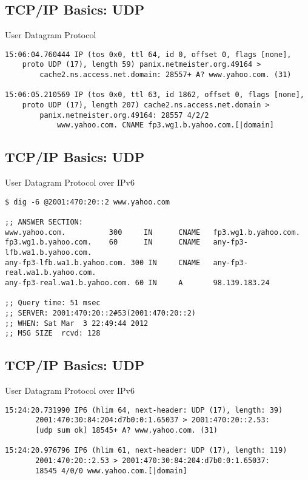 \documentclass[xga]{xdvislides}
\begin{document}
\subsection{TCP/IP Basics: UDP}
\begin{center}
User Datagram Protocol
\end{center}
\vspace{.2in}
\begin{verbatim}
15:06:04.760444 IP (tos 0x0, ttl 64, id 0, offset 0, flags [none],
    proto UDP (17), length 59) panix.netmeister.org.49164 >
        cache2.ns.access.net.domain: 28557+ A? www.yahoo.com. (31)

15:06:05.210569 IP (tos 0x0, ttl 63, id 1862, offset 0, flags [none],
    proto UDP (17), length 207) cache2.ns.access.net.domain >
        panix.netmeister.org.49164: 28557 4/2/2
            www.yahoo.com. CNAME fp3.wg1.b.yahoo.com.[|domain]
\end{verbatim}

\subsection{TCP/IP Basics: UDP}
\begin{center}
User Datagram Protocol over IPv6
\end{center}
\vspace{.2in}
\begin{verbatim}
$ dig -6 @2001:470:20::2 www.yahoo.com

;; ANSWER SECTION:
www.yahoo.com.          300     IN      CNAME   fp3.wg1.b.yahoo.com.
fp3.wg1.b.yahoo.com.    60      IN      CNAME   any-fp3-lfb.wa1.b.yahoo.com.
any-fp3-lfb.wa1.b.yahoo.com. 300 IN     CNAME   any-fp3-real.wa1.b.yahoo.com.
any-fp3-real.wa1.b.yahoo.com. 60 IN     A       98.139.183.24

;; Query time: 51 msec
;; SERVER: 2001:470:20::2#53(2001:470:20::2)
;; WHEN: Sat Mar  3 22:49:44 2012
;; MSG SIZE  rcvd: 128

\end{verbatim}

\subsection{TCP/IP Basics: UDP}
\begin{center}
User Datagram Protocol over IPv6
\end{center}
\vspace{.2in}
\begin{verbatim}
15:24:20.731990 IP6 (hlim 64, next-header: UDP (17), length: 39)
       2001:470:30:84:204:d7b0:0:1.65037 > 2001:470:20::2.53:
       [udp sum ok] 18545+ A? www.yahoo.com. (31)

15:24:20.976796 IP6 (hlim 61, next-header: UDP (17), length: 119)
       2001:470:20::2.53 > 2001:470:30:84:204:d7b0:0:1.65037:
       18545 4/0/0 www.yahoo.com.[|domain]

\end{verbatim}
\end{document}
